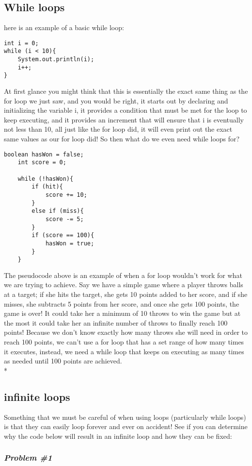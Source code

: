 \documentclass[14pt]{extreport}%
\begin{document}
\subsection*{While loops}
here is an example of a basic while loop:
\begin{lstlisting}
int i = 0;
while (i < 10){
    System.out.println(i);
    i++;
}
\end{lstlisting}{}
At first glance you might think that this is essentially the exact same thing as the for loop we just saw, and you would be right, it starts out by declaring and initializing the variable i, it provides a condition that must be met for the loop to keep executing, and it provides an increment that will ensure that i is eventually not less than 10, all just like the for loop did, it will even print out the exact same values as our for loop did! So then what do we even need while loops for?
\begin{lstlisting}
boolean hasWon = false;
    int score = 0;

    while (!hasWon){
        if (hit){
            score += 10;
        }
        else if (miss){
            score -= 5;
        }
        if (score == 100){
            hasWon = true;
        }
    }
\end{lstlisting}{}
The pseudocode above is an example of when a for loop wouldn't work for what we are trying to achieve. Say we have a simple game where a player throws balls at a target; if she hits the target, she gets 10 points added to her score, and if she misses, she subtracts 5 points from her score, and once she gets 100 points, the game is over! It could take her a minimum of 10 throws to win the game but at the most it could take her an infinite number of throws to finally reach 100 points! Because we don't know exactly how many throws she will need in order to reach 100 points, we can't use a for loop that has a set range of how many times it executes, instead, we need a while loop that keeps on executing as many times as needed until 100 points are achieved. \\*

\subsection*{infinite loops}
Something that we must be careful of when using loops (particularly while loops) is that they can easily loop forever and ever on accident! See if you can determine why the code below will result in an infinite loop and how they can be fixed:
\subsubsection{\textit{Problem \#1}}
\end{document}
